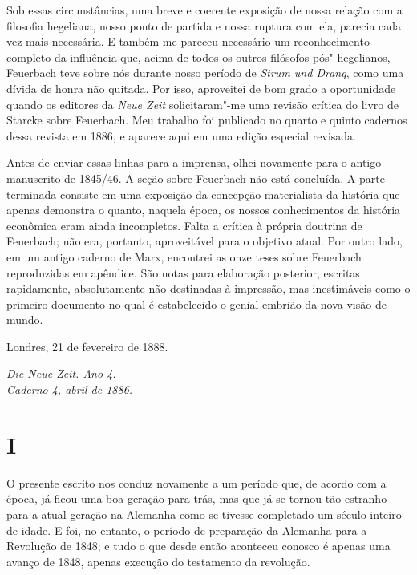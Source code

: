 Sob essas circunstâncias, uma breve e coerente exposição de nossa
relação com a filosofia hegeliana, nosso ponto de partida e nossa
ruptura com ela, parecia cada vez mais necessária. E também me pareceu
necessário um reconhecimento completo da influência que, acima de todos
os outros filósofos pós"-hegelianos, Feuerbach teve sobre nós durante
nosso período de \emph{Strum und Drang}, como uma dívida de honra não
quitada. Por isso, aproveitei de bom grado a oportunidade quando os
editores da \emph{Neue Zeit} solicitaram"-me uma revisão crítica do
livro de Starcke sobre Feuerbach. Meu trabalho foi publicado no quarto e
quinto cadernos dessa revista em 1886, e aparece aqui em uma edição
especial revisada.

Antes de enviar essas linhas para a imprensa, olhei novamente para o antigo
manuscrito de 1845/46. A seção sobre Feuerbach não está
concluída. A parte terminada consiste em uma exposição da concepção
materialista da história que apenas demonstra o quanto, naquela época,
os nossos conhecimentos da história econômica eram ainda incompletos.
Falta a crítica à própria doutrina de Feuerbach; não era, portanto,
aproveitável para o objetivo atual. Por outro lado, em um antigo caderno
de Marx, encontrei as onze teses sobre Feuerbach reproduzidas em
apêndice. São notas para elaboração posterior, escritas rapidamente,
absolutamente não destinadas à impressão, mas inestimáveis ​​como o
primeiro documento no qual é estabelecido o genial embrião da nova
visão de mundo.

\bigskip

\hfill{}Londres, 21 de fevereiro de 1888. 

\quebra

\begin{flushright}
\emph{Die Neue Zeit. Ano 4.}\\
\emph{Caderno 4, abril de 1886.}
\end{flushright}

\vspace{2cm}


\section{I}

\noindent{}O presente escrito
nos conduz novamente a um período que, de acordo com a época, já ficou
uma boa geração para trás, mas que já se tornou tão estranho 
para a atual geração na Alemanha como se tivesse
completado um século inteiro de idade. E foi, no entanto, o período de
preparação da Alemanha para a Revolução de 1848; e tudo o que desde
então aconteceu conosco é apenas uma avanço de 1848, apenas execução do
testamento da revolução.

